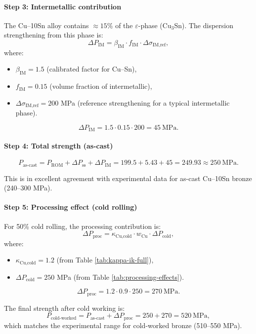 \documentclass[12pt,a4paper]{article}
\begin{document}
	\paragraph{Step 3: Intermetallic contribution}
	The Cu–10Sn alloy contains \(\approx 15\%\) of the \(\varepsilon\)-phase (Cu\(_3\)Sn). The dispersion strengthening from this phase is:
	\[
	\Delta P_{\text{IM}} = \beta_{\text{IM}} \cdot f_{\text{IM}} \cdot \Delta \sigma_{\text{IM,ref}},
	\]
	where:
	\begin{itemize}
		\item \(\beta_{\text{IM}} = 1.5\) (calibrated factor for Cu–Sn),
		\item \(f_{\text{IM}} = 0.15\) (volume fraction of intermetallic),
		\item \(\Delta \sigma_{\text{IM,ref}} = 200\) MPa (reference strengthening for a typical intermetallic phase).
	\end{itemize}
	\[
	\Delta P_{\text{IM}} = 1.5 \cdot 0.15 \cdot 200 = 45\ \text{MPa}.
	\]
	
	\paragraph{Step 4: Total strength (as-cast)}
	\[
	P_{\text{as-cast}} = P_{\text{ROM}} + \Delta P_{\text{ss}} + \Delta P_{\text{IM}} = 199.5 + 5.43 + 45 = 249.93 \approx 250\ \text{MPa}.
	\]
	
	This is in excellent agreement with experimental data for as-cast Cu–10Sn bronze (240–300 MPa).
	
	\paragraph{Step 5: Processing effect (cold rolling)}
	For 50\% cold rolling, the processing contribution is:
	\[
	\Delta P_{\text{proc}} = \kappa_{\text{Cu,cold}} \cdot w_{\text{Cu}} \cdot \Delta P_{\text{cold}},
	\]
	where:
	\begin{itemize}
		\item \(\kappa_{\text{Cu,cold}} = 1.2\) (from Table \ref{tab:kappa-ik-full}),
		\item \(\Delta P_{\text{cold}} = 250\) MPa (from Table \ref{tab:processing-effects}).
	\end{itemize}
	\[
	\Delta P_{\text{proc}} = 1.2 \cdot 0.9 \cdot 250 = 270\ \text{MPa}.
	\]
	
	The final strength after cold working is:
	\[
	P_{\text{cold-worked}} = P_{\text{as-cast}} + \Delta P_{\text{proc}} = 250 + 270 = 520\ \text{MPa},
	\]
	which matches the experimental range for cold-worked bronze (510–550 MPa).
	
\end{document}
